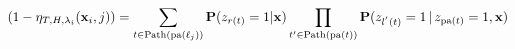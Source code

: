 \documentclass{article}
\newcommand{\R}{\mathbb{R}}
\newcommand{\cH}{\mathcal{H}}
\newcommand{\cL}{\mathcal{L}}
\newcommand{\path}{\text{Path}}
\newcommand{\Path}[1]{\mathrm{Path}(#1)}
\newcommand{\pa}[1]{\mathrm{pa}(#1)}
\newcommand{\leaves}{d}
\renewcommand{\vec}[1]{\mathbf{#1}}
\newcommand{\bx}{\mathbf{x}}
\newcommand{\by}{\vec{y}}
\newcommand{\prob}{\mathbf{P}}
\newcommand{\given}{\, | \,}
\newcommand{\Algo}[1]{\textsc{#1}}
\begin{document}
\[
(1-\eta_{T,H,\lambda_i} ( \bx_i , j )) = \sum_{t \in \Path{\pa{\ell_j}}}   \prob(z_{r(t)} = 1 | \bx)  \prod_{t' \in \Path{\pa{t}}} \prob(z_{l^{'}(t)} = 1 \given z_{\pa{t}} =1, \bx)  \notag
\]







\end{document}
